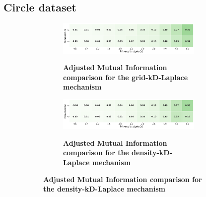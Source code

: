 \subsection{Circle dataset} \label{appendix:results-mechanism-utility-circle-dataset}
\begin{figure}[H]
    \centering
    \begin{subfigure}[b]{0.90\textwidth}
        \begin{subfigure}[c]{1\textwidth}
            \caption{\textbf{Adjusted Mutual Information comparison for the grid-kD-Laplace mechanism}}
            \includegraphics[width=1\textwidth]{Results/kd-laplace/grid-kd-Laplace/circle-dataset/ami.png}
            \label{fig:ami_circle-dataset_comparison_grid-kd_2d}
        \end{subfigure}
        \vfill %
        \begin{subfigure}[c]{1\textwidth}
            \caption{\textbf{Adjusted Mutual Information comparison for the density-kD-Laplace mechanism}}
            \includegraphics[width=1\textwidth]{Results/kd-laplace/density-kd-Laplace/circle-dataset/ami.png}
            \label{fig:ami_circle-dataset_comparison_density-kd_2d}
        \end{subfigure}
    \end{subfigure}
    \hfill %
    \begin{subfigure}[b]{0.075\textwidth}

\end{subfigure}
\end{figure}
